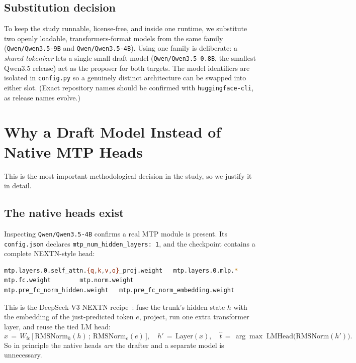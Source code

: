 \documentclass[11pt]{article}
\begin{document}
\subsection{Substitution decision}
To keep the study runnable, license-free, and inside one runtime, we substitute
two openly loadable, transformers-format models from the same family
(\texttt{Qwen/Qwen3.5-9B} and \texttt{Qwen/Qwen3.5-4B}). Using one family is
deliberate: a \emph{shared tokenizer} lets a single small draft model
(\texttt{Qwen/Qwen3.5-0.8B}, the smallest Qwen3.5 release) act as the proposer
for both targets. The model
identifiers are isolated in \texttt{config.py} so a genuinely distinct
architecture can be swapped into either slot. (Exact repository names should be
confirmed with \texttt{huggingface-cli}, as release names evolve.)

\section{Why a Draft Model Instead of Native MTP Heads}
\label{sec:why-draft}
This is the most important methodological decision in the study, so we justify
it in detail.

\subsection{The native heads exist}
Inspecting \texttt{Qwen/Qwen3.5-4B} confirms a real MTP module is present. Its
\texttt{config.json} declares \texttt{mtp\_num\_hidden\_layers: 1}, and the
checkpoint contains a complete NEXTN-style head:
\begin{lstlisting}[language=bash,basicstyle=\ttfamily\footnotesize]
mtp.layers.0.self_attn.{q,k,v,o}_proj.weight   mtp.layers.0.mlp.*
mtp.fc.weight        mtp.norm.weight
mtp.pre_fc_norm_hidden.weight   mtp.pre_fc_norm_embedding.weight
\end{lstlisting}
This is the DeepSeek-V3 NEXTN recipe~\cite{deepseekv3}: fuse the trunk's hidden
state $h$ with the embedding of the just-predicted token $e$, project, run one
extra transformer layer, and reuse the tied LM head:
\begin{equation}
\label{eq:nextn}
x \,=\, W_{\text{fc}}\,\big[\,\mathrm{RMSNorm}_h(h)\,;\,\mathrm{RMSNorm}_e(e)\,\big],
\quad
h' \,=\, \mathrm{Layer}(x),
\quad
\hat{t} \,=\, \arg\max\;\mathrm{LMHead}\big(\mathrm{RMSNorm}(h')\big).
\end{equation}
So in principle the native heads \emph{are} the drafter and a separate model is
unnecessary.
\end{document}
